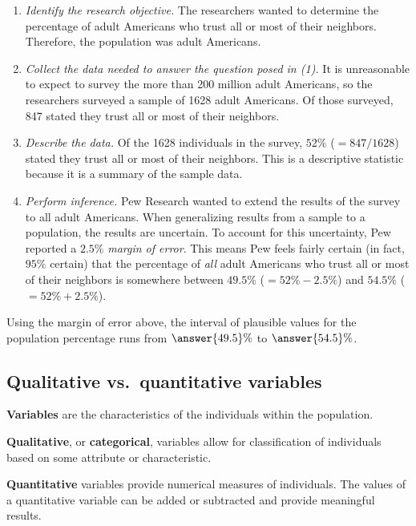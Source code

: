 \documentclass{ximera}
\begin{document}
\begin{enumerate}
  \item \textit{Identify the research objective.} The researchers wanted to determine the percentage of adult Americans who trust all or most of their neighbors. Therefore, the population was adult Americans.
  \item \textit{Collect the data needed to answer the question posed in (1).} It is unreasonable to expect to survey the more than 200 million adult Americans, so the researchers surveyed a sample of 1628 adult Americans. Of those surveyed, 847 stated they trust all or most of their neighbors.
  \item \textit{Describe the data.} Of the 1628 individuals in the survey, $52\%$ ($=847/1628$) stated they trust all or most of their neighbors. This is a descriptive statistic because it is a summary of the sample data.
  \item \textit{Perform inference.} Pew Research wanted to extend the results of the survey to all adult Americans. When generalizing results from a sample to a population, the results are uncertain. To account for this uncertainty, Pew reported a $2.5\%$ \emph{margin of error}. This means Pew feels fairly certain (in fact, $95\%$ certain) that the percentage of \emph{all} adult Americans who trust all or most of their neighbors is somewhere between $49.5\%$ ($=52\%-2.5\%$) and $54.5\%$ ($=52\%+2.5\%$).
\end{enumerate}

\begin{problem}
Using the margin of error above, the interval of plausible values for the population percentage runs from $\answer{49.5}\%$ to $\answer{54.5}\%$.
\end{problem}

\subsection*{Qualitative vs.\ quantitative variables}

\begin{definition}
\textbf{Variables} are the characteristics of the individuals within the population.

\textbf{Qualitative}, or \textbf{categorical}, variables allow for classification of individuals based on some attribute or characteristic.

\textbf{Quantitative} variables provide numerical measures of individuals. The values of a quantitative variable can be added or subtracted and provide meaningful results.
\end{definition}
\end{document}
